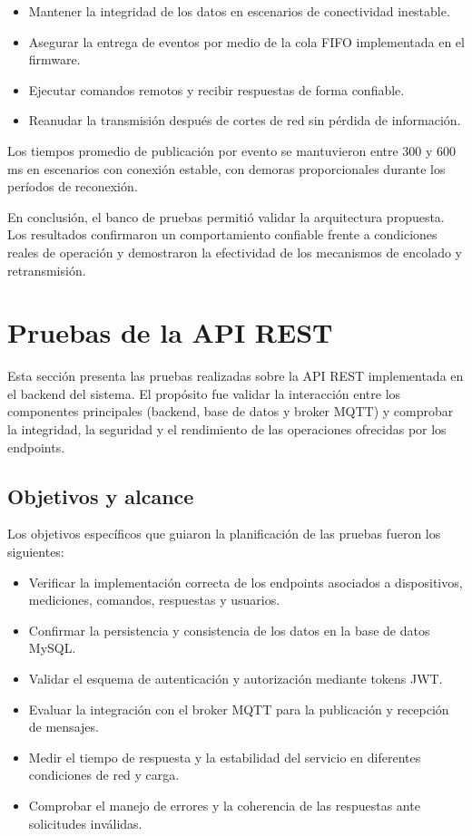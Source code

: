 \begin{itemize}
    \item Mantener la integridad de los datos en escenarios de conectividad inestable.
    \item Asegurar la entrega de eventos por medio de la cola FIFO implementada en el firmware.
    \item Ejecutar comandos remotos y recibir respuestas de forma confiable.
    \item Reanudar la transmisión después de cortes de red sin pérdida de información.
\end{itemize}

Los tiempos promedio de publicación por evento se mantuvieron entre 300 y 600 ms en escenarios con conexión estable, con demoras proporcionales durante los períodos de reconexión.

En conclusión, el banco de pruebas permitió validar la arquitectura propuesta. 
Los resultados confirmaron un comportamiento confiable frente a condiciones reales de operación y demostraron la efectividad de los mecanismos de encolado y retransmisión.


\section{Pruebas de la API REST}

Esta sección presenta las pruebas realizadas sobre la API REST implementada en el backend del sistema. 
El propósito fue validar la interacción entre los componentes principales (backend, base de datos y broker MQTT) y comprobar la integridad, la seguridad y el rendimiento de las operaciones ofrecidas por los endpoints.

\subsection{Objetivos y alcance}

Los objetivos específicos que guiaron la planificación de las pruebas fueron los siguientes:

\begin{itemize}
    \item Verificar la implementación correcta de los endpoints asociados a dispositivos, mediciones, comandos, respuestas y usuarios.
    \item Confirmar la persistencia y consistencia de los datos en la base de datos MySQL.
    \item Validar el esquema de autenticación y autorización mediante tokens JWT.
    \item Evaluar la integración con el broker MQTT para la publicación y recepción de mensajes.
    \item Medir el tiempo de respuesta y la estabilidad del servicio en diferentes condiciones de red y carga.
    \item Comprobar el manejo de errores y la coherencia de las respuestas ante solicitudes inválidas.
\end{itemize}

